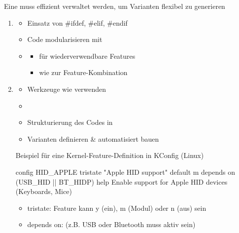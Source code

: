 \begin{infoBox}[title=Verwaltung der Produktlinien-Artefakte]
    Eine  muss effizient verwaltet werden, um Varianten flexibel zu generieren
    \begin{enumerate}
        \item {}
        \begin{itemize}
            \item Einsatz von \#ifdef, \#elif, \#endif
            \item Code modularisieren mit 
            \item {}
            \begin{itemize}
                \item {} für wiederverwendbare Features
                \item {} wie  zur Feature-Kombination
            \end{itemize}
        \end{itemize}
        \item {}
        \begin{itemize}
            \item Werkzeuge wie  verwenden
            \item {}
            \item Strukturierung des Codes in 
            \item {} Varianten definieren \& automatisiert bauen
        \end{itemize}
        Beispiel für eine Kernel-Feature-Definition in KConfig (Linux)
        \begin{codeBlock}{}
            config HID_APPLE
                tristate "Apple HID support"
                default m
                depends on (USB_HID || BT_HIDP)
                help
                    Enable support for Apple HID devices (Keyboards, Mice)
        \end{codeBlock}
        \begin{itemize}
            \item tristate: Feature kann y (ein), m (Modul) oder n (aus) sein
            \item depends on:  (z.B. USB oder Bluetooth muss aktiv sein)
        \end{itemize}
    \end{enumerate}
\end{infoBox}